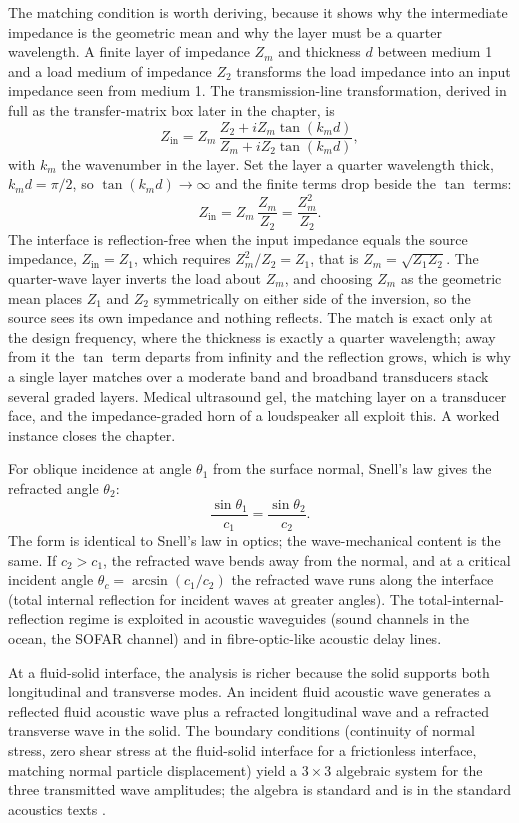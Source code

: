 The matching condition is worth deriving, because it shows why the
intermediate impedance is the geometric mean and why the layer must be a
quarter wavelength. A finite layer of impedance $Z_m$ and thickness $d$
between medium 1 and a load medium of impedance $Z_2$ transforms the load
impedance into an input impedance seen from medium 1. The transmission-line
transformation, derived in full as the transfer-matrix box later in the
chapter, is
\[
Z_{\text{in}} = Z_m\,
\frac{Z_2 + i Z_m\tan(k_m d)}{Z_m + i Z_2\tan(k_m d)},
\]
with $k_m$ the wavenumber in the layer. Set the layer a quarter
wavelength thick, $k_m d = \pi/2$, so $\tan(k_m d)\to\infty$ and the
finite terms drop beside the $\tan$ terms:
\[
Z_{\text{in}} = Z_m\,\frac{Z_m}{Z_2} = \frac{Z_m^2}{Z_2}.
\]
The interface is reflection-free when the input impedance equals the
source impedance, $Z_{\text{in}} = Z_1$, which requires
$Z_m^2/Z_2 = Z_1$, that is $Z_m = \sqrt{Z_1 Z_2}$. The quarter-wave layer
inverts the load about $Z_m$, and choosing $Z_m$ as the geometric mean
places $Z_1$ and $Z_2$ symmetrically on either side of the inversion, so
the source sees its own impedance and nothing reflects. The match is exact
only at the design frequency, where the thickness is exactly a quarter
wavelength; away from it the $\tan$ term departs from infinity and the
reflection grows, which is why a single layer matches over a moderate
band and broadband transducers stack several graded layers. Medical
ultrasound gel, the matching layer on a transducer face, and the
impedance-graded horn of a loudspeaker all exploit this. A worked
instance closes the chapter.

For oblique incidence at angle $\theta_1$ from the surface normal,
Snell's law gives the refracted angle $\theta_2$:
\[
\frac{\sin\theta_1}{c_1} = \frac{\sin\theta_2}{c_2}.
\]
The form is identical to Snell's law in optics; the wave-mechanical
content is the same. If $c_2 > c_1$, the refracted wave bends away
from the normal, and at a critical incident angle
$\theta_c = \arcsin(c_1/c_2)$ the refracted wave runs along the
interface (total internal reflection for incident waves at greater
angles). The total-internal-reflection regime is exploited in
acoustic waveguides (sound channels in the ocean, the SOFAR channel)
and in fibre-optic-like acoustic delay lines.

At a fluid-solid interface, the analysis is richer because the solid
supports both longitudinal and transverse modes. An incident fluid
acoustic wave generates a reflected fluid acoustic wave plus a
refracted longitudinal wave and a refracted transverse wave in the
solid. The boundary conditions (continuity of normal stress, zero
shear stress at the fluid-solid interface for a frictionless interface,
matching normal particle displacement) yield a $3 \times 3$ algebraic
system for the three transmitted wave amplitudes; the algebra is
standard and is in the standard acoustics texts \cite[chs.~6,
8]{text:kinsler-acoustics}.

